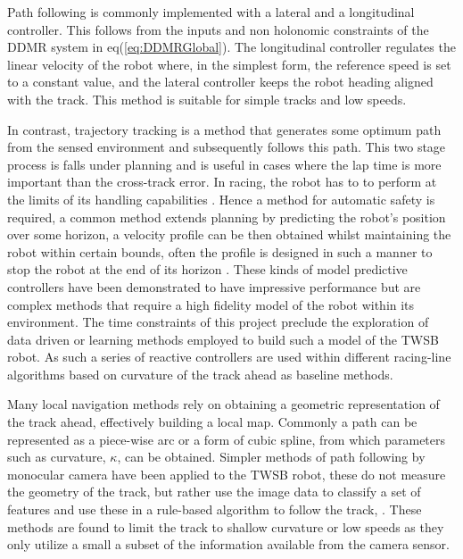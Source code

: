         Path following is commonly implemented with a lateral and a longitudinal controller. This follows from the 
        inputs and non holonomic constraints of the DDMR system in eq(\ref{eq:DDMRGlobal}).
        The longitudinal controller regulates the linear velocity of the robot where, in the simplest form, the reference speed 
        is set to a constant value, and the lateral controller keeps the robot heading aligned with the track. 
        This method is suitable for simple tracks and low speeds.
        
        In contrast, trajectory tracking is a method that generates some optimum path from the sensed environment and subsequently follows this path.
        This two stage process is falls under planning and is useful in cases where the lap time is more important than the cross-track error.
        In racing, the robot has to to perform at the limits of its handling capabilities \cite{wischnewski2022indy}. Hence a method 
        for automatic safety is required, a common method extends planning by predicting the robot's position over some horizon,
        a velocity profile can be then obtained whilst maintaining the robot within certain bounds, often the profile is 
        designed in such a manner to stop the robot at the end of its horizon \cite{williams2016aggressive}. These kinds of model predictive controllers 
        have been demonstrated to have impressive performance but are complex methods that require a high fidelity model of the robot within its environment. 
        The time constraints of this project preclude the exploration of data driven 
        or learning methods employed to build such a model of the TWSB robot. As such a series of reactive controllers are used within different 
        racing-line algorithms based on curvature of the track ahead as baseline methods.
            
        Many local navigation methods rely on obtaining a geometric representation of the track ahead, effectively building a local map.
        Commonly a path can be represented as a piece-wise arc or a form of cubic spline, from which parameters such as curvature, $\kappa$, 
        can be obtained. Simpler methods of path following by monocular camera have been applied to the TWSB robot, these do not measure the 
        geometry of the track, but rather use the image data to classify a set of features and use these in a rule-based algorithm to follow the 
        track, \cite{visionlinetwsb} \cite{ismail2009vision} \cite{nntwsbvision}.
        These methods are found to limit the track to shallow curvature or low speeds as they only utilize a small 
        a subset of the information available from the camera sensor. 

